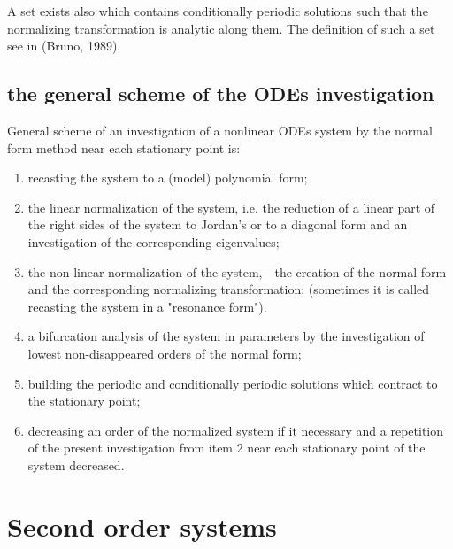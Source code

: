 A set exists also which contains conditionally periodic solutions
such that the normalizing transformation is analytic along them.
The definition of such a set see in (Bruno, 1989).

\subsection{the general scheme of the ODEs investigation}

General scheme of an investigation of a nonlinear ODEs system 
by the normal form method near each stationary point is:

\begin{enumerate} 

\item
    recasting the system to a (model) polynomial form;

\item
    the linear normalization of the system, i.e. the reduction of 
a linear part of the right sides of the system to Jordan's or to a 
diagonal form and an investigation of the corresponding eigenvalues;

\item
    the non-linear normalization of the system,---the creation of
the normal form and the corresponding normalizing transformation;
(sometimes it is called recasting the system in a "resonance form").

\item
    a bifurcation analysis of the system in parameters by the 
investigation of lowest non-disappeared orders of the normal form;


\item
    building the periodic and conditionally periodic solutions
which contract to the stationary point;

\item
    decreasing an order of the normalized system if it necessary and
a repetition of the present investigation from item 2 near each 
stationary point of the system decreased.

\end{enumerate} 

\section{Second order systems}


